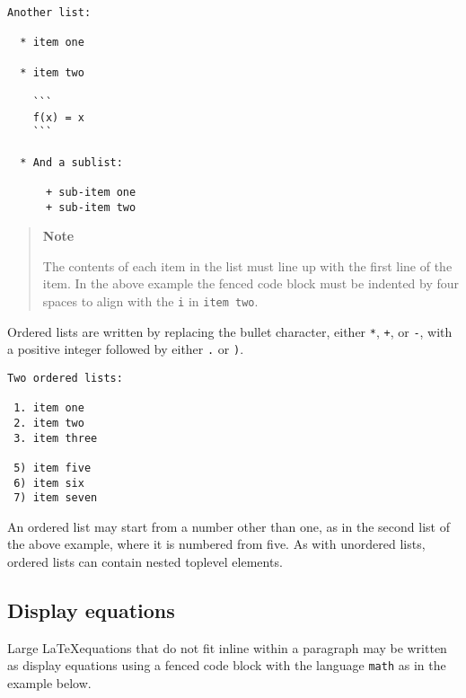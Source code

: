 \begin{lstlisting}
Another list:

  * item one

  * item two

    ```
    f(x) = x
    ```

  * And a sublist:

      + sub-item one
      + sub-item two
\end{lstlisting}



\begin{quote}
\textbf{Note}

The contents of each item in the list must line up with the first line of the item. In the above example the fenced code block must be indented by four spaces to align with the \texttt{i} in \texttt{item two}.

\end{quote}


Ordered lists are written by replacing the {\textquotedbl}bullet{\textquotedbl} character, either \texttt{*}, \texttt{+}, or \texttt{-}, with a positive integer followed by either \texttt{.} or \texttt{)}.




\begin{lstlisting}
Two ordered lists:

 1. item one
 2. item two
 3. item three

 5) item five
 6) item six
 7) item seven
\end{lstlisting}



An ordered list may start from a number other than one, as in the second list of the above example, where it is numbered from five. As with unordered lists, ordered lists can contain nested toplevel elements.



\hypertarget{8249559303631128892}{}


\subsection{Display equations}



Large  \LaTeX  equations that do not fit inline within a paragraph may be written as display equations using a fenced code block with the {\textquotedbl}language{\textquotedbl} \texttt{math} as in the example below.




